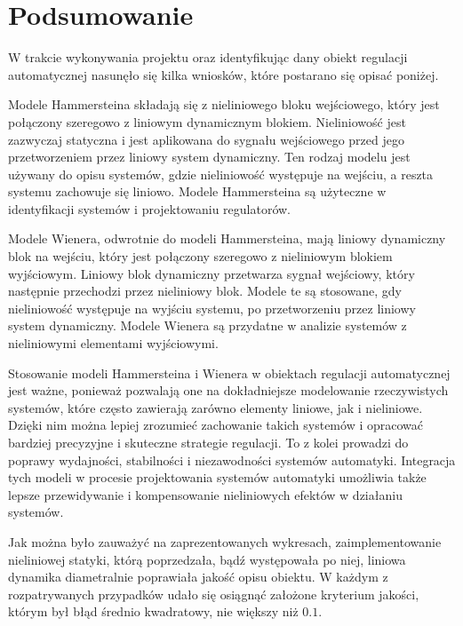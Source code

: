 \chapter{Podsumowanie}
W trakcie wykonywania projektu oraz identyfikując dany obiekt regulacji automatycznej nasunęło się kilka wniosków, które postarano się opisać poniżej.

Modele Hammersteina składają się z nieliniowego bloku wejściowego, który jest połączony szeregowo z liniowym dynamicznym blokiem. Nieliniowość jest zazwyczaj statyczna i jest aplikowana do sygnału wejściowego przed jego przetworzeniem przez liniowy system dynamiczny. Ten rodzaj modelu jest używany do opisu systemów, gdzie nieliniowość występuje na wejściu, a reszta systemu zachowuje się liniowo. Modele Hammersteina są użyteczne w identyfikacji systemów i projektowaniu regulatorów.

Modele Wienera, odwrotnie do modeli Hammersteina, mają liniowy dynamiczny blok na wejściu, który jest połączony szeregowo z nieliniowym blokiem wyjściowym. Liniowy blok dynamiczny przetwarza sygnał wejściowy, który następnie przechodzi przez nieliniowy blok. Modele te są stosowane, gdy nieliniowość występuje na wyjściu systemu, po przetworzeniu przez liniowy system dynamiczny. Modele Wienera są przydatne w analizie systemów z nieliniowymi elementami wyjściowymi.

Stosowanie modeli Hammersteina i Wienera w obiektach regulacji automatycznej jest ważne, ponieważ pozwalają one na dokładniejsze modelowanie rzeczywistych systemów, które często zawierają zarówno elementy liniowe, jak i nieliniowe. Dzięki nim można lepiej zrozumieć zachowanie takich systemów i opracować bardziej precyzyjne i skuteczne strategie regulacji. To z kolei prowadzi do poprawy wydajności, stabilności i niezawodności systemów automatyki. Integracja tych modeli w procesie projektowania systemów automatyki umożliwia także lepsze przewidywanie i kompensowanie nieliniowych efektów w działaniu systemów.

Jak można było zauważyć na zaprezentowanych wykresach, zaimplementowanie nieliniowej statyki, którą poprzedzała, bądź występowała po niej, liniowa dynamika diametralnie poprawiała jakość opisu obiektu. W każdym z rozpatrywanych przypadków udało się osiągnąć założone kryterium jakości, którym był błąd średnio kwadratowy, nie większy niż $\num{0.1}$. 